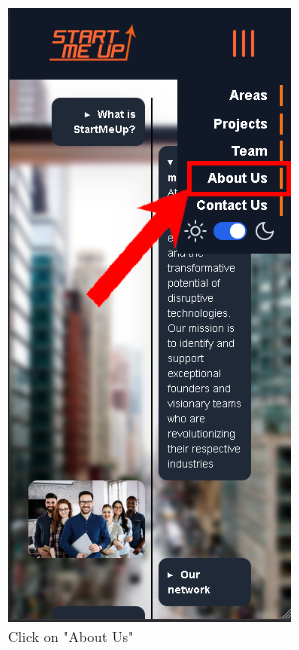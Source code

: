 \documentclass[11pt, letterpaper]{article}
\begin{document}
\begin{figure}[H]
  \centering
  \begin{minipage}[b]{0.4\textwidth}
    \includegraphics[width=7.5cm]{images/Scenarios/Scenario4/Screen3.png}
    \caption{Click on "About Us"}
    \label{fig:scenario4_3}
  \end{minipage}
  \hfill
  \begin{minipage}[b]{0.4\textwidth}

\end{minipage}
\end{figure}
\end{document}
